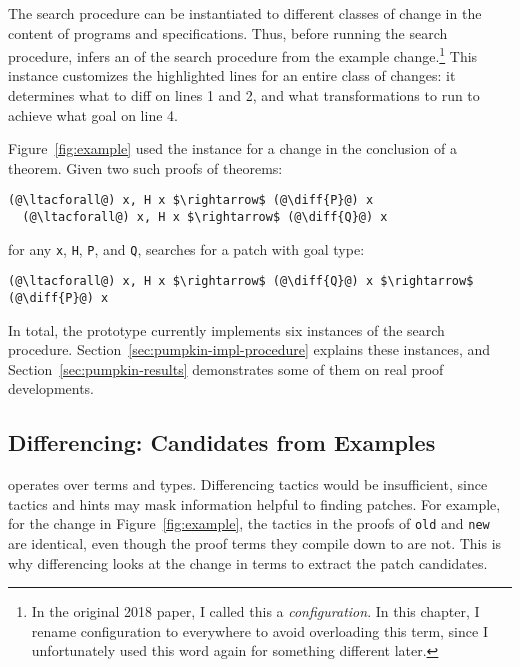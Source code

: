 The search procedure can be instantiated to different classes of change in the content of programs and specifications.
Thus, before running the search procedure, \sysname infers an  of the search 
procedure from the example change.\footnote{In the original 2018 \sysnamelong paper, I called this a \textit{configuration}.
In this chapter, I rename configuration to  everywhere to avoid overloading this term,
since I unfortunately used this word again for something different later.}
This instance customizes the highlighted lines for an entire class of changes:
it determines what to diff on lines 1 and 2,
and what transformations to run to achieve what goal on line 4.

Figure~\ref{fig:example} used the instance for a change in the conclusion of a theorem.
Given two such proofs of theorems:

\begin{lstlisting}[language=coq]
  (@\ltacforall@) x, H x $\rightarrow$ (@\diff{P}@) x
  (@\ltacforall@) x, H x $\rightarrow$ (@\diff{Q}@) x
\end{lstlisting}
for any \lstinline{x}, \lstinline{H}, \lstinline{P}, and \lstinline{Q},
\sysname searches for a patch with goal type:

\begin{lstlisting}[language=coq]
  (@\ltacforall@) x, H x $\rightarrow$ (@\diff{Q}@) x $\rightarrow$ (@\diff{P}@) x
\end{lstlisting}

In total, the \sysname prototype currently implements six instances of the search procedure.
Section~\ref{sec:pumpkin-impl-procedure} explains these instances,
and Section~\ref{sec:pumpkin-results} demonstrates some of them on real proof developments.

\subsection{Differencing: Candidates from Examples}
\label{sec:pumpkin-spec-diff}

 operates over terms and types. Differencing tactics
would be insufficient, since tactics and hints may mask information helpful to finding patches.
For example, for the change in Figure~\ref{fig:example},
the tactics in the proofs of \lstinline{old} and \lstinline{new} are identical, even 
though the proof terms they compile down to are not. %
This is why differencing looks at the change in terms to extract the patch candidates.

